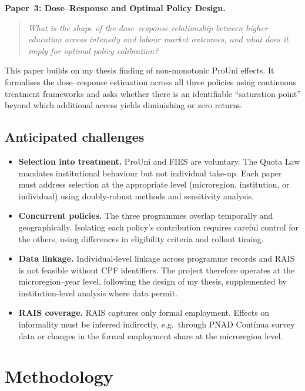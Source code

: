 \documentclass[a4paper,11pt]{article}
\begin{document}
\textbf{Paper~3: Dose--Response and Optimal Policy Design.}
\begin{quote}
\textit{What is the shape of the dose--response relationship between higher education access intensity and labour market outcomes, and what does it imply for optimal policy calibration?}
\end{quote}
This paper builds on my thesis finding of non-monotonic ProUni effects. It formalises the dose--response estimation across all three policies using continuous treatment frameworks \citep{callaway2024} and asks whether there is an identifiable ``saturation point'' beyond which additional access yields diminishing or zero returns.

\subsection{Anticipated challenges}

\begin{itemize}[nosep]
    \item \textbf{Selection into treatment.} ProUni and FIES are voluntary. The Quota Law mandates institutional behaviour but not individual take-up. Each paper must address selection at the appropriate level (microregion, institution, or individual) using doubly-robust methods and sensitivity analysis.
    \item \textbf{Concurrent policies.} The three programmes overlap temporally and geographically. Isolating each policy's contribution requires careful control for the others, using differences in eligibility criteria and rollout timing.
    \item \textbf{Data linkage.} Individual-level linkage across programme records and RAIS is not feasible without CPF identifiers. The project therefore operates at the microregion--year level, following the design of my thesis, supplemented by institution-level analysis where data permit.
    \item \textbf{RAIS coverage.} RAIS captures only formal employment. Effects on informality must be inferred indirectly, e.g.\ through PNAD Cont\'inua survey data or changes in the formal employment share at the microregion level.
\end{itemize}

\section{Methodology}
\end{document}

